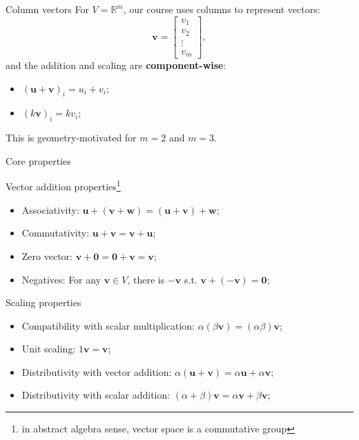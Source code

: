 \documentclass[10pt]{beamer}
\begin{document}
\begin{frame}{Column vectors}
    For $V = \mathbb R^m$, our course uses columns to represent vectors:
    $$
    \mathbf v = \begin{bmatrix}
        v_1 \\ v_2 \\ \vdots \\ v_m
    \end{bmatrix},
    $$
    and the addition and scaling are \textbf{component-wise}:
    \begin{itemize}
        \item $(\mathbf u + \mathbf v)_i = u_i + v_i$;
        \item $(k \mathbf v)_i = k v_i$;
    \end{itemize}

    This is geometry-motivated for $m=2$ and $m=3$.
\end{frame}

\begin{frame}{Core properties}
    \begin{block}{Vector addition properties\footnote{in abstract algebra sense, vector space is a commutative group}}
    \begin{itemize}
        \item Associativity: $\mathbf u + (\mathbf v + \mathbf w) = (\mathbf u + \mathbf v) + \mathbf w$;
        \item Commutativity: $\mathbf u + \mathbf v = \mathbf v + \mathbf u$;
        \item Zero vector: $\mathbf v + \mathbf 0 = \mathbf 0 + \mathbf v = \mathbf v$;
        \item Negatives: For any $\mathbf v \in V$, there is $-\mathbf v$ s.t. $\mathbf v + (-\mathbf v) = \mathbf 0$;
    \end{itemize}
    \end{block}
    \begin{block}{Scaling properties}
        \begin{itemize}
            \item Compatibility with scalar multiplication: $\alpha (\beta \mathbf v) = (\alpha \beta) \mathbf v$;
            \item Unit scaling: $1 \mathbf v = \mathbf v$;
            \item Distributivity with vector addition: $\alpha (\mathbf u + \mathbf v) = \alpha \mathbf u + \alpha \mathbf v$;
            \item Distributivity with scalar addition: $(\alpha+\beta) \mathbf v = \alpha \mathbf v + \beta \mathbf v$;
        \end{itemize}
    \end{block}
\end{frame}
\end{document}
